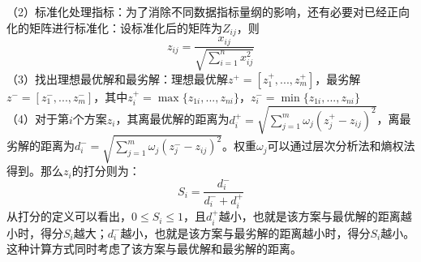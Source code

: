 \documentclass[11pt,a4paper]{article}
\begin{document}
\noindent（2）标准化处理指标：为了消除不同数据指标量纲的影响，还有必要对已经正向化的矩阵进行标准化：设标准化后的矩阵为$Z_{ij}$，则
\begin{equation*}
	z_{ij}=\dfrac{x_{ij}}{\sqrt{\sum_{i=1}^{n}x_{ij}^2}}
\end{equation*}
（3）找出理想最优解和最劣解：理想最优解$z^+=[z_1^+,...,z_m^+]$，最劣解$z^-=[z_1^-,...,z_m^-]$，其中$z_i^+=\max \{ z_{1i}, ..., z_{ni}\}$，$z_i^-=\min \{ z_{1i}, ..., z_{ni}\}$\\
（4）对于第$i$个方案$z_i$，其离最优解的距离为$d_i^+=\sqrt{\sum_{j=1}^{m}\omega_j(z_j^+-z_{ij})^2}$，离最劣解的距离为$d_i^-=\sqrt{\sum_{j=1}^{m}\omega_j(z_j^--z_{ij})^2}$。权重$\omega_j$可以通过层次分析法和熵权法得到。那么$z_i$的打分则为：
\begin{equation*}
	S_i=\dfrac{d_i^-}{d_i^-+d_i^+}
\end{equation*}
从打分的定义可以看出，$0\le S_i \le 1$，且$d_i^+$越小，也就是该方案与最优解的距离越小时，得分$S_i$越大；$d_i^-$越小，也就是该方案与最劣解的距离越小时，得分$S_i$越小。这种计算方式同时考虑了该方案与最优解和最劣解的距离。\\
\end{document}
